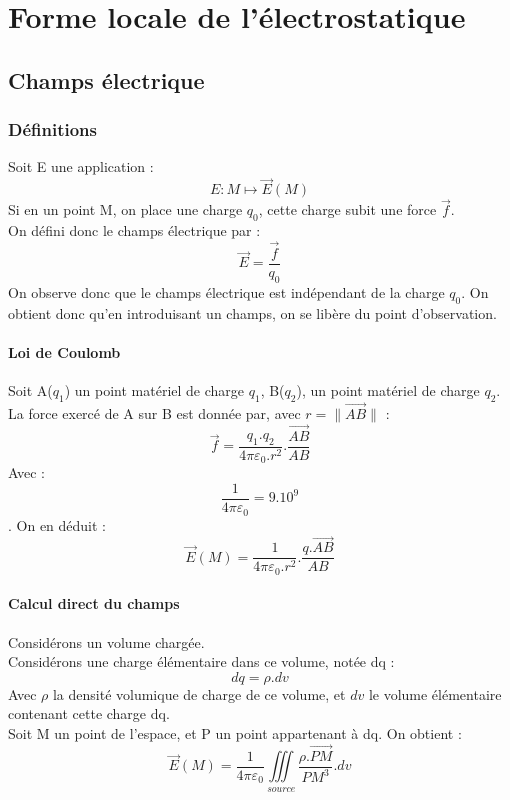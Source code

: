 \chapter{Forme locale de l'électrostatique}
\section{Champs électrique}
\subsection{Définitions}
\begin{de}
Soit E une application :
$$E : M \mapsto \overrightarrow{E}(M)$$
Si en un point M, on place une charge $q_0$, cette charge subit une force $\overrightarrow{f}$.\\
On défini donc le champs électrique par : 
$$\overrightarrow{E} = \dfrac{\overrightarrow{f}}{q_0}$$
On observe donc que le champs électrique est indépendant de la charge $q_0$. On obtient donc qu'en introduisant un champs, on se libère du point d'observation.
\end{de}
\subsubsection{Loi de Coulomb}
\begin{de}
Soit A($q_1$) un point matériel de charge $q_1$, B($q_2$), un point matériel de charge $q_2$. La force exercé de A sur B est donnée par, avec $r = \parallel\overrightarrow{AB}\parallel$ : 
$$\overrightarrow{f} = \dfrac{q_1.q_2}{4\pi\varepsilon_0.r^2}.\dfrac{\overrightarrow{AB}}{AB}$$
Avec : 
$$\dfrac{1}{4\pi\varepsilon_0} = 9.10^9$$.
On en déduit : 
$$\overrightarrow{E}(M) = \dfrac{1}{4\pi\varepsilon_0.r^2}.\dfrac{q.\overrightarrow{AB}}{AB}$$
\end{de}
\subsubsection{Calcul direct du champs}
Considérons un volume chargée.\\
Considérons une charge élémentaire dans ce volume, notée dq : 
$$dq = \rho.dv$$
Avec $\rho$ la densité volumique de charge de ce volume, et $dv$ le volume élémentaire contenant cette charge dq.\\
Soit M un point de l'espace, et P un point appartenant à dq.
On obtient : 
$$\overrightarrow{E}(M) = \dfrac{1}{4\pi\varepsilon_0}\underset{source}\iiint \dfrac{\rho.\overrightarrow{PM}}{PM^3}.dv$$
